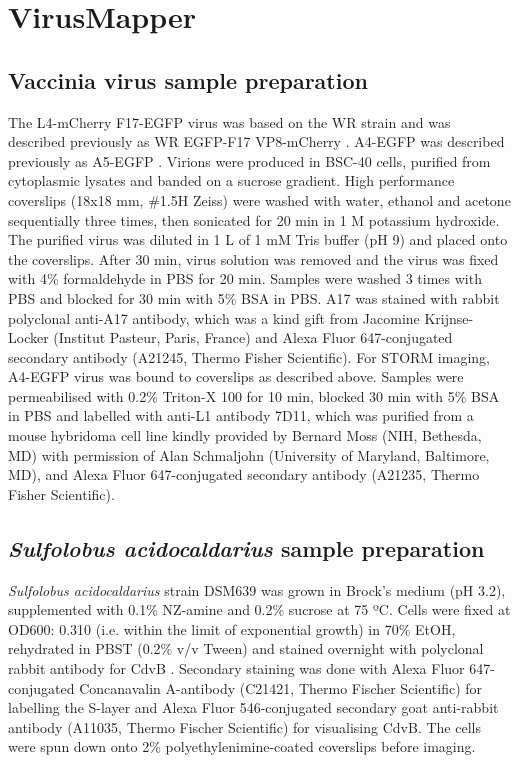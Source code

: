 \section{VirusMapper}

\subsection{Vaccinia virus sample preparation}
 
The L4-mCherry F17-EGFP virus was based on the WR strain and was described previously as WR EGFP-F17 VP8-mCherry \cite{schmidt2013vaccinia}. A4-EGFP was described previously as A5-EGFP \cite{schmidt2011vaccinia}. Virions were produced in BSC-40 cells, purified from cytoplasmic lysates and banded on a sucrose gradient. High performance coverslips (18x18 mm, \#1.5H Zeiss) were washed with water, ethanol and acetone sequentially three times, then sonicated for 20 min in 1 M potassium hydroxide. The purified virus was diluted in 1 \textmu{}L of 1 mM Tris buffer (pH 9) and placed onto the coverslips. After 30 min, virus solution was removed and the virus was fixed with 4\% formaldehyde in PBS for 20 min. Samples were washed 3 times with PBS and blocked for 30 min with 5\% BSA in PBS. A17 was stained with rabbit polyclonal anti-A17 antibody, which was a kind gift from Jacomine Krijnse-Locker (Institut Pasteur, Paris, France) and Alexa Fluor 647-conjugated secondary antibody (A21245, Thermo Fisher Scientific). For STORM imaging, A4-EGFP virus was bound to coverslips as described above. Samples were permeabilised with 0.2\% Triton-X 100 for 10 min, blocked 30 min with 5\% BSA in PBS and labelled with anti-L1 antibody 7D11, which was purified from a mouse hybridoma cell line kindly provided by Bernard Moss (NIH, Bethesda, MD) with permission of Alan Schmaljohn (University of Maryland, Baltimore, MD), and Alexa Fluor 647-conjugated secondary antibody (A21235, Thermo Fisher Scientific). 

\subsection{\textit{Sulfolobus acidocaldarius} sample preparation}

\textit{Sulfolobus acidocaldarius} strain DSM639 was grown in Brock’s medium (pH 3.2), supplemented with 0.1\% NZ-amine and 0.2\% sucrose at 75 ºC. Cells were fixed at OD600: 0.310 (i.e. within the limit of exponential growth) in 70\% EtOH, rehydrated in PBST (0.2\% v/v Tween) and stained overnight with polyclonal rabbit antibody for CdvB \cite{lindaas2008unique}. Secondary staining was done with Alexa Fluor 647-conjugated Concanavalin A-antibody (C21421, Thermo Fischer Scientific) for labelling the S-layer and Alexa Fluor 546-conjugated secondary goat anti-rabbit antibody (A11035, Thermo Fischer Scientific) for visualising CdvB. The cells were spun down onto 2\% polyethylenimine-coated coverslips before imaging.
 
